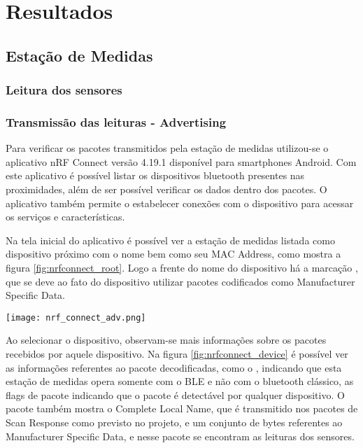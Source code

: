 \section{Resultados}

\subsection{Estação de Medidas}

\subsubsection{Leitura dos sensores}

\subsubsection{Transmissão das leituras - Advertising}

Para verificar os pacotes transmitidos pela estação de medidas utilizou-se o
aplicativo nRF Connect versão 4.19.1 disponível para smartphones Android. Com
este aplicativo é possível listar os dispositivos bluetooth presentes nas
proximidades, além de ser possível verificar os dados dentro dos pacotes. O
aplicativo também permite o estabelecer conexões com o dispositivo para acessar
os serviços e características.

Na tela inicial do aplicativo é possível ver a estação de medidas listada como
dispositivo próximo com o nome  bem como seu MAC Address,
como mostra a figura \ref{fig:nrfconnect_root}. Logo a frente do nome do
dispositivo há a marcação , que se deve ao fato do
dispositivo utilizar pacotes codificados como Manufacturer Specific Data.


\begin{center}
	\centering 
	\texttt{[image: nrf\_connect\_adv.png]}
	\label{fig:nrfconnect_root}
\end{center} 

Ao selecionar o dispositivo, observam-se mais informações sobre os pacotes
recebidos por aquele dispositivo. Na figura \ref{fig:nrfconnect_device} é
possível ver as informações referentes ao pacote decodificadas, como o
, indicando que esta estação de medidas opera somente com
o BLE e não com o bluetooth clássico, as flags de pacote indicando que o pacote
é detectável por qualquer dispositivo. O pacote também mostra o Complete Local
Name, que é transmitido nos pacotes de Scan Response como previsto no projeto, e
um conjunto de bytes referentes ao Manufacturer Specific Data, e nesse pacote se
encontram as leituras dos sensores.

